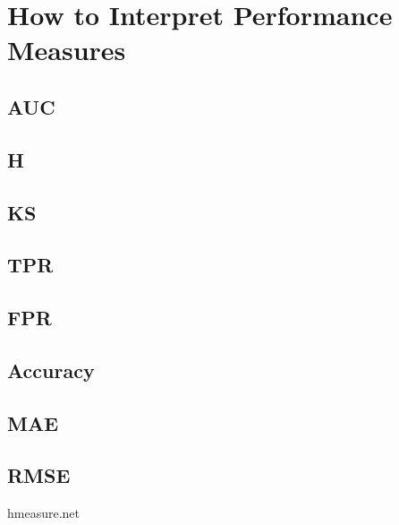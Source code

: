 \documentclass[twoside,a4paper]{refart}
\begin{document}
\section{How to Interpret Performance Measures}
\subsection{AUC}
\subsection{H}
\subsection{KS}
\subsection{TPR}
\subsection{FPR}
\subsection{Accuracy}
\subsection{MAE}
\subsection{RMSE}
hmeasure.net
\end{document}
